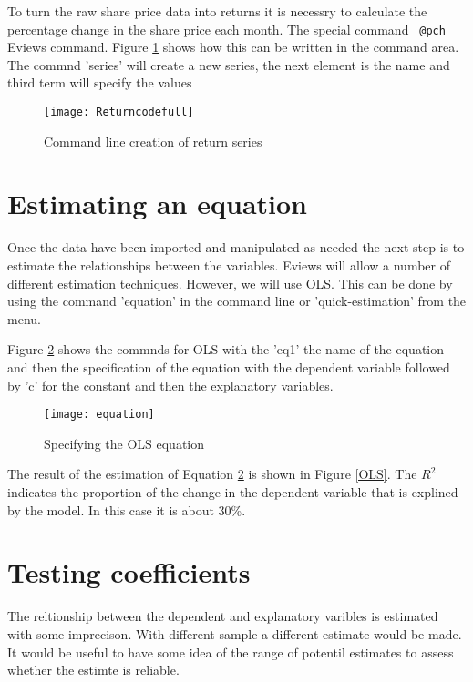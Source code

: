 \documentclass{article}\usepackage[]{graphicx}\usepackage[]{color}
\begin{document}
To turn the raw share price data into returns it is necessry to calculate the percentage change in the share price each month. The special command \verb + @pch + Eviews command.  Figure \ref{RC} shows how this can be written in the command area.  The commnd 'series' will create a new series, the next element is the name and third term will specify the values 

\begin{figure}[h!]
\graphicspath{{"../Eviews/Figures/"}}
\centering
\texttt{[image: Returncodefull]}
\caption{Command line creation of return series}
\label{RC}
\end{figure}

\section{Estimating an equation}
Once the data have been imported and manipulated as needed the next step is to estimate the relationships between the variables.  Eviews will allow a number of different estimation techniques. However, we will use OLS.  This can be done by using the command 'equation' in the command line or 'quick-estimation' from the menu.  

Figure \ref{eq} shows the commnds for OLS with the 'eq1' the name of the equation and then the specification of the equation with the dependent variable followed by 'c' for the constant and then the explanatory variables. 

\begin{figure}[h!]
\graphicspath{{"../Eviews/Figures/"}}
\centering
\texttt{[image: equation]}
\caption{Specifying the OLS equation}
\label{eq}
\end{figure}

The result of the estimation of Equation \ref{eq} is shown in Figure \ref{OLS}. The $R^2$ indicates the proportion of the change in the dependent variable that is explined by the model. In this case it is about 30\%.   




\section{Testing coefficients}
The reltionship between the dependent and explanatory varibles is estimated with some imprecison.  With different sample a different estimate would be made.  It would be useful to have some idea of the range of potentil estimates to assess whether the estimte is reliable. 
\end{document}
